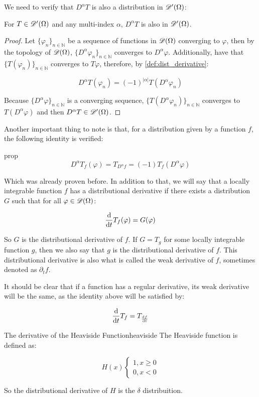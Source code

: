 We need to verify that $D^\alpha T$ is also a distribution in $\mathscr{D}'(\Omega)$:

\begin{theorem}{}{}
    For $T\in\mathscr{D}'(\Omega)$ and any multi-index $\alpha$, $D^\alpha T$ is also in $\mathscr{D}'(\Omega)$.
\end{theorem}

\begin{proof}
    Let $\{\varphi_n\}_{n\in\mathbb{N}}$ be a sequence of functions in $\mathscr{D}(\Omega)$ converging to $\varphi$, then by the topology of $\mathscr{D}(\Omega)$, $\{D^\alpha\varphi_n\}_{n\in\mathbb{N}}$ converges to $D^\alpha\varphi$. Additionally, have that $\{T(\varphi_n)\}_{n\in\mathbb{N}}$ converges to $T\varphi$, therefore, by \cref{def:dist_derivative}:

    \[D^\alpha T(\varphi_n) = (-1)^{\left\lvert\alpha \right\rvert}T(D^\alpha\varphi_n)\]

    Because $\{D^\alpha\varphi\}_{n\in\mathbb{N}}$ is a converging sequence, $\{T(D^\alpha\varphi_n)\}_{n\in\mathbb{N}}$ converges to $T(D^\alpha\varphi)$ and then $D^\alpha T\in\mathscr{D}'(\Omega)$.


\end{proof}
Another important thing to note is that, for a distribution given by a function $f$, the following identity is verified:

\begin{lemma}{}{prop}
    \[D^\alpha T_f(\varphi) = T_{D^\alpha f} = (-1)T_f(D^\alpha\varphi)\]
\end{lemma}

Which was already proven before. In addition to that, we will say that a locally integrable function $f$ has a distributional derivative if there exists a distribution $G$ such that for all $\varphi\in\mathscr{D}(\Omega)$:

\[\dv{}{t}T_f(\varphi) = G(\varphi)\]

So $G$ is the distributional derivative of $f$. If $G=T_g$ for some locally integrable function $g$, then we also say that $g$ is the distributional derivative of $f$. This distributional derivative is also what is called the weak derivative of $f$, sometimes denoted as $\partial_t f$.

It should be clear that if a function has a regular derivative, its weak derivative will be the same, as the identity above will be satisfied by:

\[\dv{}{t}T_f = T_{\dv{f}{t}}\]


\begin{example}{The derivative of the Heaviside Function}{heaviside}
    The Heaviside function is defined as:

    \[
    H(x)
    \begin{cases}
        1, x \geq 0\\
        0, x < 0
    \end{cases}
    \]

    So the distributional derivative of $H$ is the $\delta$ distribuition.
\end{example}

